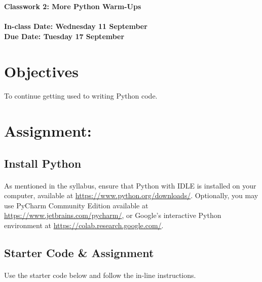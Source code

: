 \documentclass[letter,10pt]{article}
\begin{document}
    \huge
    \textbf{Classwork 2: More Python Warm-Ups}
    \normalsize
    \\ ~~ \\
    \textbf{In-class Date: Wednesday 11 September} \\
    \textbf{Due Date: Tuesday 17 September}
    
    \section*{Objectives}
    \paragraph{}To continue getting used to writing Python code.
    
    \section*{Assignment:}
    \subsection{Install Python}
    \paragraph{}As mentioned in the syllabus, ensure that Python with IDLE is installed on your computer, available at \url{https://www.python.org/downloads/}. Optionally, you may use PyCharm Community Edition available at \url{https://www.jetbrains.com/pycharm/}, or Google's interactive Python environment at \url{https://colab.research.google.com/}.
    
    \subsection*{Starter Code \& Assignment}
    \paragraph{}Use the starter code below and follow the in-line instructions.
    
\end{document}
